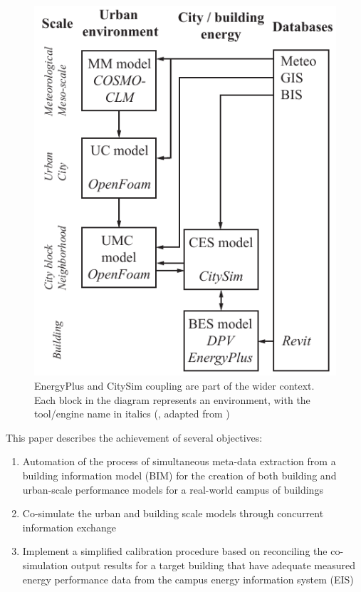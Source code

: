 \documentclass{tBPS2e}
\theoremstyle{plain}
\theoremstyle{definition}
\theoremstyle{remark}
\begin{document}
\begin{figure}
\centering
\includegraphics[scale=0.7]{figures/UMEM_overview_new}
\caption{EnergyPlus and CitySim coupling are part of the wider context. Each block in the diagram represents an environment, with the tool/engine name in italics (\citep{thomas2014multiscale}, adapted from \citep{Dorer:2013vt})}
\label{fig:UMEM}
\end{figure}

This paper describes the achievement of several objectives:
\begin{enumerate}
  \item Automation of the process of simultaneous meta-data extraction from a building information model (BIM) for the creation of both building and urban-scale performance models for a real-world campus of buildings
  \item Co-simulate the urban and building scale models through concurrent information exchange
  \item Implement a simplified calibration procedure based on reconciling the co-simulation output results for a target building that have adequate measured energy performance data from the campus energy information system (EIS) 
\end{enumerate}
\end{document}
